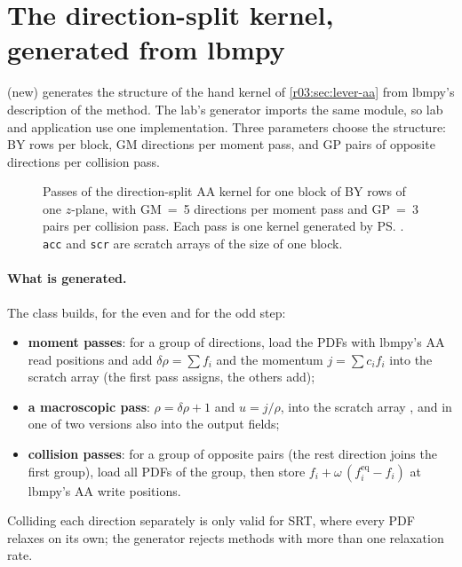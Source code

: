 \section{The direction-split kernel, generated from lbmpy}\label{r03:sec:wl-split}

 (new) generates the structure of the hand
kernel of \cref{r03:sec:lever-aa} from lbmpy's description of the method. The lab's generator
 imports the same module, so lab and application use one
implementation. Three parameters choose the structure: BY rows per block, GM directions per
moment pass, and GP pairs of opposite directions per collision pass.

\begin{figure}[htbp]
  \centering
  
  \caption[Passes of the direction-split AA kernel]{Passes of the direction-split AA kernel for
    one block of BY rows of one $z$-plane, with GM~=~5 directions per moment pass and GP~=~3
    pairs per collision pass. Each pass is one kernel generated by \ps{}. \texttt{acc} and
    \texttt{scr} are scratch arrays of the size of one block.}\label{r03:fig:split}
\end{figure}

\paragraph{What is generated.} The class  builds, for the even and for the odd
step:
\begin{itemize}
  \item \textbf{moment passes}: for a group of directions, load the PDFs with lbmpy's AA read
        positions and add $\delta\rho = \sum f_i$ and the momentum $j = \sum c_i f_i$ into the
        scratch array  (the first pass assigns, the others add);
  \item \textbf{a macroscopic pass}: $\rho = \delta\rho + 1$ and $u = j / \rho$, into the scratch
        array , and in one of two versions also into the output fields;
  \item \textbf{collision passes}: for a group of opposite pairs (the rest direction joins the
        first group), load all PDFs of the group, then store $f_i + \omega\,(f^{\mathrm{eq}}_i -
        f_i)$ at lbmpy's AA write positions.
\end{itemize}
Colliding each direction separately is only valid for SRT, where every PDF relaxes on its own;
the generator rejects methods with more than one relaxation rate.

